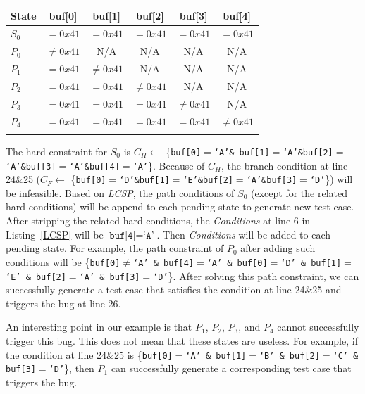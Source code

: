 \begin{table}[!b]
{\begin{tabular*}{20pc}{@{\extracolsep{\fill}}lccccc@{}}\toprule
State  & buf[0] & buf[1] & buf[2] & buf[3] & buf[4]\\ 
\midrule
		$S_0$  &  $=0x41$ & $=0x41$ & $=0x41$ & $=0x41$ & $=0x41$ \\
		$P_0$  &  $\neq0x41$ & N/A & N/A & N/A & N/A \\
		$P_1$  &  $=0x41$ & $\neq0x41$ & N/A & N/A & N/A\\
		$P_2$  &  $=0x41$ & $=0x41$ & $\neq0x41$ & N/A & N/A \\
		$P_3$  &  $=0x41$ & $=0x41$ & $=0x41$ & $\neq0x41$ & N/A \\
		$P_4$  &  $=0x41$ & $=0x41$ & $=0x41$ & $=0x41$ & $\neq0x41$ \\
\botrule
\end{tabular*}}{}
\end{table}

The hard constraint for $S_0$ is $C_{H}\leftarrow$ \{\texttt{buf[0]$=$`A'\& buf[1]$=$`A'\&buf[2]$=$`A'\&buf[3]$=$`A'\&buf[4]$=$`A'}\}. 
Because of $C_{H}$, the branch condition at line 24\&25 ($C_{F}\leftarrow$ \{\texttt{buf[0]$=$`D'\&buf[1]$=$`E'\&buf[2]$=$`A'\&buf[3]$=$`D'}\}) will 
be infeasible.
Based on \textit{LCSP}, the path conditions of $S_0$ (except for the related 
hard conditions) will be append to each pending state to generate new test case. 
After stripping the related hard conditions, the \textit{Conditions} at line 
6 in Listing~\ref{LCSP} will be $\texttt{buf[4]}=\texttt{`A'}$. 
Then \textit{Conditions} will be added to each pending state. For example, 
the path constraint of $P_0$ after adding such conditions will be 
\{\texttt{buf[0]$\neq$`A' \& buf[4]$=$`A' \& buf[0]$=$`D' \& buf[1]$=$`E' \& buf[2]$=$`A' \& buf[3]$=$`D'}\}. After solving this path constraint, we can successfully 
generate a test case that satisfies the condition at line 24\&25 and 
triggers the bug at line 26. 

An interesting point in our example is that $P_1$, $P_2$, $P_3$, and 
$P_4$ cannot successfully trigger this bug. This does not mean that 
these states are useless. 
For example, if the condition at line 24\&25 is 
\{\texttt{buf[0]$=$`A' \& buf[1]$=$`B' \& buf[2]$=$`C' \& buf[3]$=$`D'}\}, 
then $P_1$ can successfully generate a corresponding test case 
that triggers the bug.

